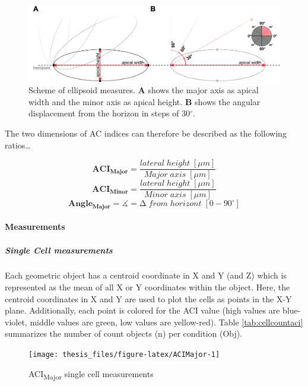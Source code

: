 \documentclass[11pt,singlespacinge,twoside]{reedthesis} %
\begin{document}
\begin{figure}

{\centering \includegraphics[width=0.75\linewidth]{figure/02-MaMo/ACI/ellipse} 

}

\caption[Scheme of ellipsoid measures]{Scheme of ellipsoid measures. \textbf{A} shows the major axis as apical width and the minor axis as apical height. \textbf{B} shows the angular displacement from the horizon in steps of 30\(^\circ\).}\label{fig:ellipse}
\end{figure}
The two dimensions of AC indices can therefore be described as the following ratios\ldots{}

\[\mathbf{ACI_{Major}} = \frac{lateral\;height\;[\mu m]}{Major\;axis\;[\mu m]}\]
\[\mathbf{ACI_{Minor}} = \frac{lateral\;height\;[\mu m]}{Minor\;axis\;[\mu m]}\]
\[\mathbf{Angle_{Major}} = \measuredangle = \mathrm{\Delta}\;from\;horizont\;[0-90^\circ]\]

\hypertarget{ACI-Dis}{%
\paragraph{Measurements}\label{ACI-Dis}}

\hypertarget{ACI-singlecell}{%
\subparagraph{Single Cell measurements}\label{ACI-singlecell}}

Each geometric object has a centroid coordinate in X and Y (and Z) which is represented as the mean of all X or Y coordinates within the object. Here, the centroid coordinates in X and Y are used to plot the cells as points in the X-Y plane. Additionally, each point is colored for the ACI value (high values are blue-violet, middle values are green, low values are yellow-red). Table \ref{tab:cellcountaci} summarizes the number of count objects (n) per condition (Obj).


\begin{figure}

{\centering \texttt{[image: thesis\_files/figure-latex/ACIMajor-1]} 

}

\caption{ACI\textsubscript{Major} single cell measurements}\label{fig:ACIMajor}
\end{figure}
\end{document}
